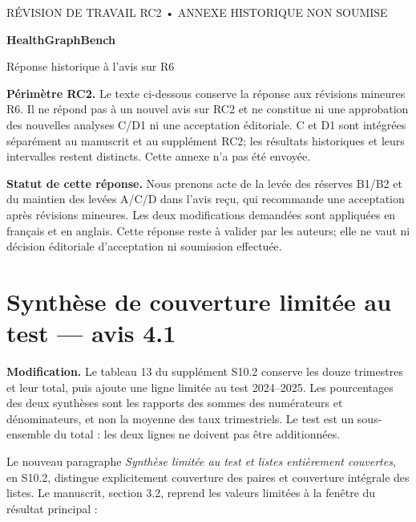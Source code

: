 \documentclass[10pt,a4paper]{article}
\begin{document}
\begin{center}
{\small RÉVISION DE TRAVAIL RC2 • ANNEXE HISTORIQUE NON SOUMISE}\par\vspace{7pt}
{\LARGE\bfseries HealthGraphBench}\par\vspace{7pt}
{\large Réponse historique à l'avis sur R6}
\end{center}

\textbf{Périmètre RC2.} Le texte ci-dessous conserve la réponse aux révisions mineures R6. Il ne répond pas à un nouvel avis sur RC2 et ne constitue ni une approbation des nouvelles analyses C/D1 ni une acceptation éditoriale. C et D1 sont intégrées séparément au manuscrit et au supplément RC2; les résultats historiques et leurs intervalles restent distincts. Cette annexe n'a pas été envoyée.

\textbf{Statut de cette réponse.} Nous prenons acte de la levée des réserves B1/B2 et du maintien des levées A/C/D dans l'avis reçu, qui recommande une acceptation après révisions mineures. Les deux modifications demandées sont appliquées en français et en anglais. Cette réponse reste à valider par les auteurs; elle ne vaut ni décision éditoriale d'acceptation ni soumission effectuée.

\section{Synthèse de couverture limitée au test — avis 4.1}

\textbf{Modification.} Le tableau 13 du supplément S10.2 conserve les douze trimestres et leur total, puis ajoute une ligne limitée au test 2024--2025. Les pourcentages des deux synthèses sont les rapports des sommes des numérateurs et dénominateurs, et non la moyenne des taux trimestriels. Le test est un sous-ensemble du total : les deux lignes ne doivent pas être additionnées.

Le nouveau paragraphe \emph{Synthèse limitée au test et listes entièrement couvertes}, en S10.2, distingue explicitement couverture des paires et couverture intégrale des listes. Le manuscrit, section 3.2, reprend les valeurs limitées à la fenêtre du résultat principal :
\end{document}
